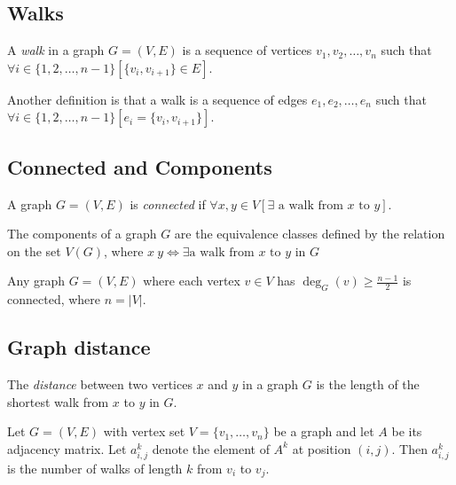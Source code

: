 \documentclass{classnotes}
\begin{document}
\subsection{Walks}
\begin{definition}[Walk]
    A \emph{walk} in a graph $G=(V,E)$ is a sequence of vertices $v_1,v_2,\dots,v_n$ such that $\forall i \in \{1,2,\dots,n-1\} [\{v_i,v_{i+1}\} \in E]$.

    Another definition is that a walk is a sequence of edges $e_1,e_2,\dots,e_n$ such that $\forall i \in \{1,2,\dots,n-1\} [e_i = \{v_i,v_{i+1}\}]$.
\end{definition}

\subsection{Connected and Components}
\begin{definition}[Connected]
    A graph $G=(V,E)$ is \emph{connected} if $\forall x,y \in V \left[\exists \text{ a walk from }x \text{ to }y\right]$.
\end{definition}

\begin{definition}[Component]
    The components of a graph $G$ are the equivalence classes defined by the relation $~$ on the set $V(G)$, where $x~y \iff \exists \text{a walk from $x$ to $y$ in $G$} $
\end{definition}

\begin{theorem}
    Any graph $G=(V,E)$ where each vertex $v\in V$ has $\deg_G(v) \ge \frac{n-1}{2}$ is connected, where $n = |V|$.
\end{theorem}

\subsection{Graph distance}
\begin{definition}[Distance]
    The \emph{distance} between two vertices $x$ and $y$ in a graph $G$ is the length of the shortest walk from $x$ to $y$ in $G$.
\end{definition}

\begin{theorem}
    Let $G=(V,E)$ with vertex set $V=\{v_1,\dots,v_n\}$ be a graph and let $A$ be its adjacency matrix. Let $a_{i,j}^k$ denote the element of $A^k$ at position
    $(i,j)$. Then $a_{i,j}^k$ is the number of walks of length $k$ from $v_i$ to $v_j$.
\end{theorem}
\end{document}
